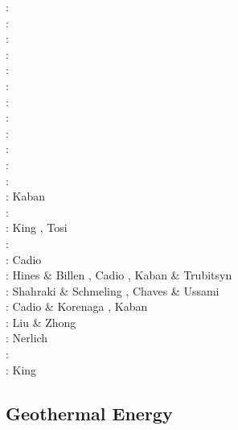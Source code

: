 \begin{scriptsize}
\nineteeneightyfour: \cite{davi84}\cite{hage84}\cite{riff84}\cite{riha84}\\
\nineteeneightyfive: \cite{hacr85}\\
\nineteeneightysix: \cite{davi86}\\
\nineteeneightyeight: \cite{besz88}\cite{fope88}\\
\nineteenninetytwo: \cite{zhgu92}\cite{kiha92}\\
\nineteenninetythree: \cite{zhch93}\cite{rirl93}\\
\nineteenninetyfour: \cite{kiha94}\\
\nineteenninetyfive: \cite{king95}\cite{mopa95}\\
\nineteenninetysix: \cite{mogu96}\\
\nineteenninetyseven: \cite{wean97a}\\
\nineteenninetyeight: \cite{cava98}\cite{chki98}\\
\twothousandone: \cite{zhon01}\\
\twothousandseven: Kaban \etal \cite{kart07}\\
\twothousandeight: \cite{meco08}\\
\twothousandnine: King \cite{king09}, Tosi \etal \cite{tocm09}\\
\twothousandten: \cite{ghbz10}\cite{spgs10b}\\
\twothousandeleven: Cadio \etal \cite{capd11}\\
\twothousandtwelve: Hines \& Billen \cite{hibi12}, Cadio \etal \cite{cabp12}, 
                    Kaban \& Trubitsyn \cite{katr12}\\
\twothousandthirteen: Shahraki \& Schmeling \cite{shsc13}, Chaves \& Ussami \cite{chus13}\\
\twothousandfourteen: Cadio \& Korenaga \cite{cako14}, Kaban \etal \cite{kaps14}\\
\twothousandfifteen: Liu \& Zhong \cite{lizh15}\\
\twothousandsixteen: Nerlich \etal \cite{necg16}\\
\twothousandseventeen: \cite{grab17}\\
\twothousandeighteen: King \cite{king18}
\end{scriptsize}

\subsection{Geothermal Energy} 


